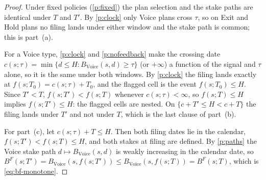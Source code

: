 \begin{proof}
Under fixed policies (\ref{p:fixed}) the plan selection and the stake paths are identical under $T$ and $T'$. By \ref{p:clock} only Voice plans cross $\tau$, so on Exit and Hold plans no filing lands under either window and the stake path is common; this is part~(a).

For a Voice type, \ref{p:clock} and \ref{p:nofeedback} make the crossing date $c(s;\tau) = \min\{d \le H : B_{\mathrm{Voice}}(s,d) \ge \tau\}$ (or $+\infty$) a function of the signal and $\tau$ alone, so it is the same under both windows. By \ref{p:clock} the filing lands exactly at $f(s;T_0) = c(s;\tau) + T_0$, and the flagged cell is the event $f(s;T_0) \le H$. Since $T' < T$, $f(s;T') < f(s;T)$ whenever $c(s;\tau) < \infty$, so $f(s;T) \le H$ implies $f(s;T') \le H$: the flagged cells are nested. On $\{c + T' \le H < c + T\}$ the filing lands under $T'$ and not under $T$, which is the last clause of part~(b).

For part~(c), let $c(s;\tau) + T \le H$. Then both filing dates lie in the calendar, $f(s;T') < f(s;T) \le H$, and both stakes at filing are defined. By \ref{p:paths} the Voice stake path $d \mapsto B_{\mathrm{Voice}}(s,d)$ is weakly increasing in the calendar date, so $B^F(s;T') = B_{\mathrm{Voice}}(s, f(s;T')) \le B_{\mathrm{Voice}}(s, f(s;T)) = B^F(s;T)$, which is \eqref{eq:bf-monotone}.
\end{proof}
